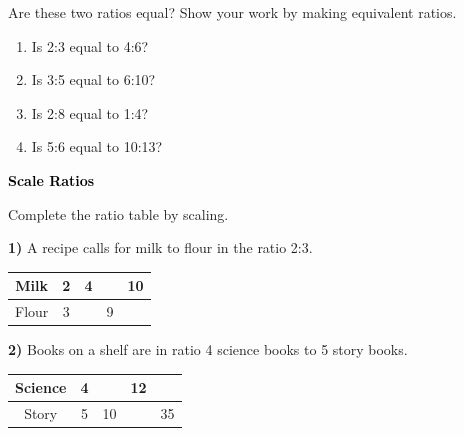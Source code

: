 \documentclass[12pt, letterpaper, fleqn]{article}
\newcommand{\blank}{\underline{\hspace{2.2cm}}}
\begin{document}
\noindent
Are these two ratios equal? Show your work by making equivalent ratios.

\vspace{3mm}

\begin{enumerate}[itemsep=2cm, leftmargin=0.6cm]

\item Is 2:3 equal to 4:6?

\vspace{1.5cm}

\item Is 3:5 equal to 6:10?

\vspace{1.5cm}

\item Is 2:8 equal to 1:4?

\vspace{1.5cm}

\item Is 5:6 equal to 10:13?

\vspace{1.5cm}

\end{enumerate}

\newpage

\begin{tcolorbox}[colback=customteal!20]
\large\textcolor{black}{\textbf{Scale Ratios}}
\end{tcolorbox}

\noindent
Complete the ratio table by scaling.

\vspace{3mm}

\noindent
\textbf{1)} A recipe calls for milk to flour in the ratio 2:3.
\vspace{2cm}
\begin{center}
\begin{tabular}{c|c|c|c|c}
Milk & 2 & 4 & \blank & 10 \\
\hline
Flour & 3 & \blank & 9 & \blank
\end{tabular}
\end{center}

\vspace{2cm}

\noindent
\textbf{2)} Books on a shelf are in ratio 4 science books to 5 story books.
\vspace{2cm}
\begin{center}
\begin{tabular}{c|c|c|c|c}
Science & 4 & \blank & 12 & \blank \\
\hline
Story & 5 & 10 & \blank & 35
\end{tabular}
\end{center}
\end{document}
